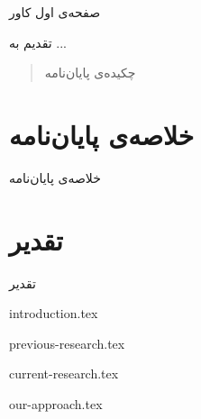 \documentclass[a4paper,11px]{article}
\begin{document}
صفحه‌ی اول کاور

\newpage


تقدیم به ...

\newpage


\begin{abstract}
چکیده‌ی پایان‌نامه
\end{abstract}
\newpage

\section*{
خلاصه‌ی پایان‌نامه
}

خلاصه‌ی پایان‌نامه
\newpage

\section*{
تقدیر
}

تقدیر
\newpage


\tableofcontents

\newpage


\listoffigures

\newpage
 
 
\listoftables

\newpage

{introduction.tex}

\newpage


{previous-research.tex}

\newpage


{current-research.tex}

\newpage


{our-approach.tex}
\end{document}
